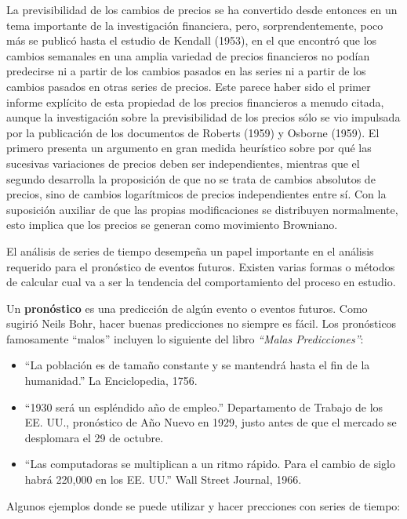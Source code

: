\documentclass[12pt,]{krantz}
\theoremstyle{definition}
\theoremstyle{definition}
\theoremstyle{definition}
\theoremstyle{remark}
\begin{document}
La previsibilidad de los cambios de precios se ha convertido desde
entonces en un tema importante de la investigación financiera, pero,
sorprendentemente, poco más se publicó hasta el estudio de Kendall
(1953), en el que encontró que los cambios semanales en una amplia
variedad de precios financieros no podían predecirse ni a partir de los
cambios pasados en las series ni a partir de los cambios pasados en
otras series de precios. Este parece haber sido el primer informe
explícito de esta propiedad de los precios financieros a menudo citada,
aunque la investigación sobre la previsibilidad de los precios sólo se
vio impulsada por la publicación de los documentos de Roberts (1959) y
Osborne (1959). El primero presenta un argumento en gran medida
heurístico sobre por qué las sucesivas variaciones de precios deben ser
independientes, mientras que el segundo desarrolla la proposición de que
no se trata de cambios absolutos de precios, sino de cambios
logarítmicos de precios independientes entre sí. Con la suposición
auxiliar de que las propias modificaciones se distribuyen normalmente,
esto implica que los precios se generan como movimiento Browniano.

El análisis de series de tiempo desempeña un papel importante en el
análisis requerido para el pronóstico de eventos futuros. Existen varias
formas o métodos de calcular cual va a ser la tendencia del
comportamiento del proceso en estudio.

Un \textbf{pronóstico} es una predicción de algún evento o eventos
futuros. Como sugirió Neils Bohr, hacer buenas predicciones no siempre
es fácil. Los pronósticos famosamente ``malos'' incluyen lo siguiente
del libro \emph{``Malas Predicciones''}:

\begin{itemize}
\item
  ``La población es de tamaño constante y se mantendrá hasta el fin de
  la humanidad.'' La Enciclopedia, 1756.
\item
  ``1930 será un espléndido año de empleo.'' Departamento de Trabajo de
  los EE. UU., pronóstico de Año Nuevo en 1929, justo antes de que el
  mercado se desplomara el 29 de octubre.
\item
  ``Las computadoras se multiplican a un ritmo rápido. Para el cambio de
  siglo habrá 220,000 en los EE. UU.'' Wall Street Journal, 1966.
\end{itemize}

Algunos ejemplos donde se puede utilizar y hacer precciones con series
de tiempo:
\end{document}
